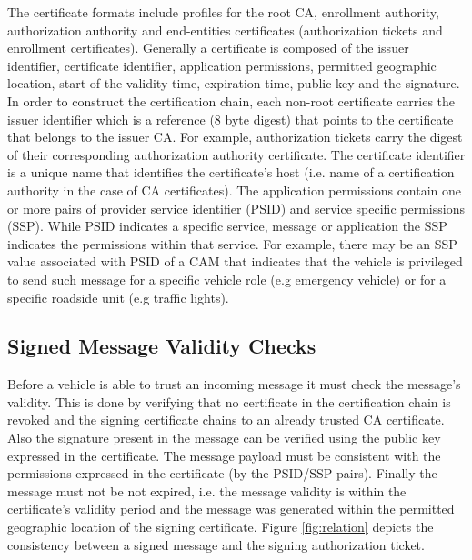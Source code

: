 The certificate formats include profiles for the root CA, enrollment authority, authorization authority and end-entities certificates (authorization tickets and enrollment certificates).
Generally a certificate is composed of the issuer identifier, certificate identifier, application permissions, permitted geographic location, start of the validity time, expiration time, public key and the signature. In order to construct the certification chain, each non-root certificate carries the issuer identifier which is a reference (8 byte digest) that points to the certificate that belongs to the issuer CA. For example, authorization tickets carry the digest of their corresponding authorization authority certificate. The certificate identifier is a unique name that identifies the certificate's host (i.e. name of a certification authority in the case of CA certificates). The application permissions contain one or more pairs of provider service identifier (PSID) and service specific permissions (SSP). While PSID indicates a specific service, message or application the SSP indicates the permissions within that service. For example, there may be an SSP value associated with PSID of a CAM that indicates that the vehicle is privileged to send such message for a specific vehicle role (e.g emergency vehicle) or for a specific roadside unit (e.g traffic lights).

\subsection{Signed Message Validity Checks}

Before a vehicle is able to trust an incoming message it must check the message's validity. This is done by verifying that no certificate in the certification chain is revoked and the signing certificate chains to an already trusted CA certificate.
Also the signature present in the message can be verified using the public key expressed in the certificate. The message payload must be consistent with the permissions expressed in the certificate (by the PSID/SSP pairs). Finally the message must not be not expired, i.e. the message validity is within the certificate's validity period and the message was generated within the permitted geographic location of the signing certificate. Figure \ref{fig:relation} depicts the consistency between a signed message and the signing authorization ticket.

